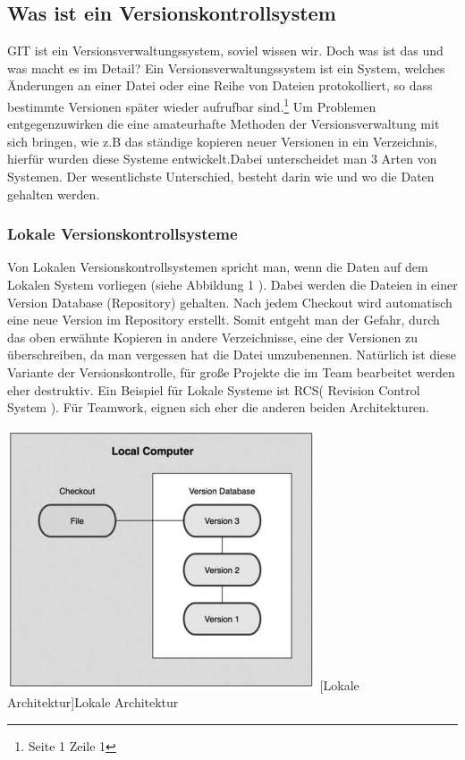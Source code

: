 \documentclass[12pt,a4paper,bibliography=totocnumbered,listof=totocnumbered]{scrartcl}
\begin{document}
\subsection{Was ist ein Versionskontrollsystem}
GIT ist ein Versionsverwaltungssystem, soviel wissen wir. Doch was ist das und was macht es im Detail? Ein Versionsverwaltungssystem ist ein System, welches Änderungen an einer Datei oder eine Reihe von Dateien protokolliert, so dass  bestimmte Versionen später wieder aufrufbar sind.\footnote{\cite{chacon2009pro} Seite 1 Zeile 1 } Um Problemen entgegenzuwirken die eine amateurhafte Methoden der Versionsverwaltung mit sich bringen, wie z.B das ständige kopieren neuer Versionen in ein Verzeichnis, hierfür wurden diese Systeme entwickelt.Dabei unterscheidet man 3 Arten von Systemen. Der wesentlichste Unterschied, besteht darin wie und wo die Daten gehalten werden.
\subsubsection{Lokale Versionskontrollsysteme}

Von Lokalen Versionskontrollsystemen spricht man, wenn die Daten auf dem Lokalen System vorliegen (siehe Abbildung 1 ). Dabei werden die Dateien in einer Version Database (Repository) gehalten. Nach jedem Checkout wird automatisch eine neue Version im Repository erstellt. Somit entgeht man der Gefahr, durch das oben erwähnte Kopieren in andere Verzeichnisse, eine der Versionen zu überschreiben, da man vergessen hat die Datei umzubenennen. Natürlich ist diese Variante der Versionskontrolle, für große Projekte die im Team bearbeitet werden eher destruktiv. Ein Beispiel für Lokale Systeme ist RCS( Revision Control System ). Für Teamwork, eignen sich eher die anderen beiden Architekturen. 
\newline
\vspace{3pt}
\begin{minipage}{\linewidth}
	\centering
	\includegraphics[width=0.4\linewidth]{Bilder/LVKS.png}
	[Lokale Architektur]{Lokale Architektur  \cite{chacon2009pro}\footnotemark }
	\label{fig:osgi}
\end{minipage}
\newpage
\end{document}
